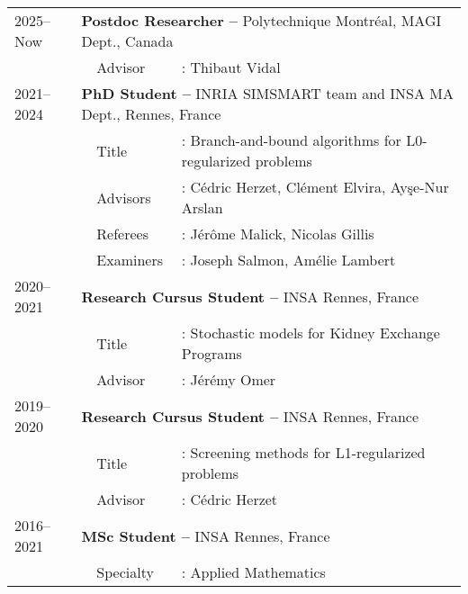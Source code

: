 \begin{longtable}[l]{@{}p{}p{}p{}p{}}
    2025--Now & \multicolumn{3}{l}{\textbf{Postdoc Researcher --} Polytechnique Montréal, MAGI Dept., Canada} \\
    & & Advisor &: Thibaut Vidal \\
    2021--2024 & \multicolumn{3}{l}{\textbf{PhD Student --} INRIA SIMSMART team and INSA MA Dept., Rennes, France} \\
    & & Title &: Branch-and-bound algorithms for L0-regularized problems \\
    & & Advisors &: Cédric Herzet, Clément Elvira, Ay\c{s}e-Nur Arslan \\
    & & Referees &:  Jérôme Malick, Nicolas Gillis \\
    & & Examiners &: Joseph Salmon, Amélie Lambert \\
    2020--2021 & \multicolumn{3}{l}{\textbf{Research Cursus Student --} INSA Rennes, France} \\
    & & Title &: Stochastic models for Kidney Exchange Programs \\
    & & Advisor &: Jérémy Omer \\
    2019--2020 & \multicolumn{3}{l}{\textbf{Research 
    Cursus Student --} INSA Rennes, France} \\
    & & Title &: Screening methods for L1-regularized problems \\
    & & Advisor &: Cédric Herzet \\
    2016--2021 & \multicolumn{3}{l}{\textbf{MSc Student --} INSA Rennes, France} \\
    & & Specialty &: Applied Mathematics 
\end{longtable}
